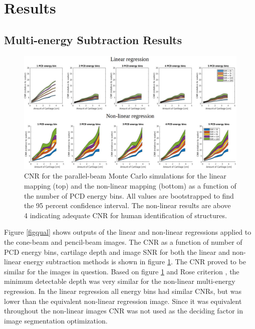 \documentclass[a4paper,11pt]{article}
\begin{document}
\section{Results}





\subsection{Multi-energy Subtraction Results}

\begin{figure}[htbp]
    \centering
\includegraphics[width = \textwidth,trim={10.5cm 0cm 0cm 0cm},clip]{figures/CNR_pb.png}
    \caption{CNR for the parallel-beam Monte Carlo simulations for the linear mapping (top) and the non-linear mapping (bottom) as a function of the number of PCD energy bins. All values are bootstrapped to find the 95 percent confidence interval. The non-linear results are above 4 indicating adequate CNR for human identification of structures.}
    \label{fig:CNR}
\end{figure}

Figure \ref{figqual} shows outputs of the linear and non-linear regressions applied to the cone-beam and pencil-beam images. The CNR as a function of number of PCD energy bins, cartilage depth and image SNR for both the linear and non-linear energy subtraction methods is shown in figure \ref{fig:CNR}. The CNR proved to be similar for the images in question. Based on figure \ref{fig:CNR} and Rose criterion \cite{Rose1975Vision:Electronic}, the minimum detectable depth was very similar for the non-linear multi-energy regression. In the linear regression all energy bins had similar CNRs, but was lower than the equivalent non-linear regression image. Since it was equivalent throughout the non-linear images CNR was not used as the deciding factor in image segmentation optimization.
\end{document}

